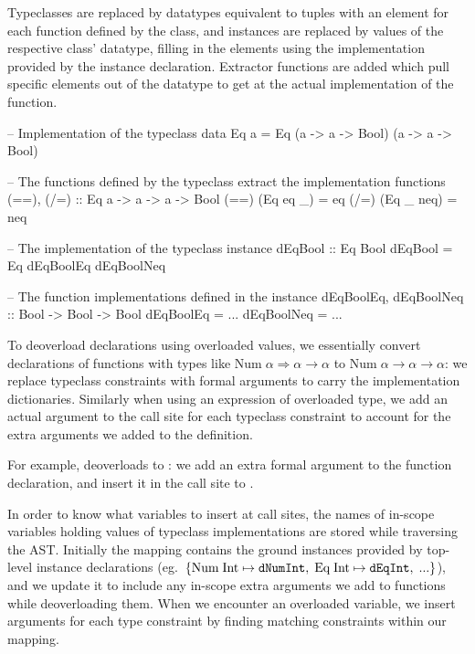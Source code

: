 \documentclass[dissertation.tex]{subfiles}
\begin{document}
{{{            Typeclasses are replaced by datatypes equivalent to tuples with an element for each function defined by the
            class, and instances are replaced by values of the respective class' datatype, filling in the elements using
            the implementation provided by the instance declaration. Extractor functions are added which pull specific
            elements out of the datatype to get at the actual implementation of the function.

            \begin{haskellfigure}
            -- Implementation of the typeclass
            data Eq a = Eq (a -> a -> Bool) (a -> a -> Bool)

            -- The functions defined by the typeclass extract the implementation functions
            (==), (/=) :: Eq a -> a -> a -> Bool
            (==) (Eq eq _) = eq
            (/=) (Eq _ neq) = neq

            -- The implementation of the typeclass instance
            dEqBool :: Eq Bool
            dEqBool = Eq dEqBoolEq dEqBoolNeq

            -- The function implementations defined in the instance
            dEqBoolEq, dEqBoolNeq :: Bool -> Bool -> Bool
            dEqBoolEq = ...
            dEqBoolNeq = ...
            \end{haskellfigure}


            To deoverload declarations using overloaded values, we essentially convert declarations of functions with
            types like \(\text{Num}\;\alpha\Rightarrow\alpha\rightarrow\alpha\) to
            \(\text{Num}\;\alpha\rightarrow\alpha\rightarrow\alpha\): we replace typeclass constraints with formal
            arguments to carry the implementation dictionaries. Similarly when using an expression of overloaded type,
            we add an actual argument to the call site for each typeclass constraint to account for the extra arguments
            we added to the definition.
            
            For example,  deoverloads to : we add an extra
            formal argument to the function declaration, and insert it in the call site to \haskell{+}.

            In order to know what variables to insert at call sites, the names of in-scope variables holding values of
            typeclass implementations are stored while traversing the AST. Initially the mapping contains the ground
            instances provided by top-level instance declarations (eg.\
            \(\{\text{Num\;Int}\mapsto\texttt{dNumInt},\;\text{Eq\;Int}\mapsto\texttt{dEqInt},\;...\}\)), and we update
            it to include any in-scope extra arguments we add to functions while deoverloading them. When we encounter
            an overloaded variable, we insert arguments for each type constraint by finding matching constraints within
            our mapping.

}}}
\end{document}
